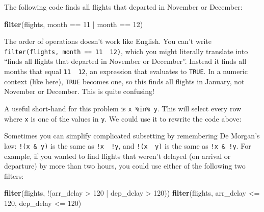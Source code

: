 \documentclass[]{book}
\newenvironment{Shaded}{\begin{snugshade}}{\end{snugshade}}
\newcommand{\KeywordTok}[1]{\textcolor[rgb]{0.13,0.29,0.53}{\textbf{{#1}}}}
\newcommand{\DecValTok}[1]{\textcolor[rgb]{0.00,0.00,0.81}{{#1}}}
\newcommand{\StringTok}[1]{\textcolor[rgb]{0.31,0.60,0.02}{{#1}}}
\newcommand{\NormalTok}[1]{{#1}}
\begin{document}
The following code finds all flights that departed in November or
December:

\begin{Shaded}
\begin{Highlighting}[]
\KeywordTok{filter}\NormalTok{(flights, month ==}\StringTok{ }\DecValTok{11} \NormalTok{|}\StringTok{ }\NormalTok{month ==}\StringTok{ }\DecValTok{12}\NormalTok{)}
\end{Highlighting}
\end{Shaded}

The order of operations doesn't work like English. You can't write
\texttt{filter(flights,\ month\ ==\ 11\ \textbar{}\ 12)}, which you
might literally translate into ``finds all flights that departed in
November or December''. Instead it finds all months that equal
\texttt{11\ \textbar{}\ 12}, an expression that evaluates to
\texttt{TRUE}. In a numeric context (like here), \texttt{TRUE} becomes
one, so this finds all flights in January, not November or December.
This is quite confusing!

A useful short-hand for this problem is \texttt{x\ \%in\%\ y}. This will
select every row where \texttt{x} is one of the values in \texttt{y}. We
could use it to rewrite the code above:

\begin{Shaded}
\end{Shaded}

Sometimes you can simplify complicated subsetting by remembering De
Morgan's law: \texttt{!(x\ \&\ y)} is the same as
\texttt{!x\ \textbar{}\ !y}, and \texttt{!(x\ \textbar{}\ y)} is the
same as \texttt{!x\ \&\ !y}. For example, if you wanted to find flights
that weren't delayed (on arrival or departure) by more than two hours,
you could use either of the following two filters:

\begin{Shaded}
\begin{Highlighting}[]
\KeywordTok{filter}\NormalTok{(flights, !(arr_delay >}\StringTok{ }\DecValTok{120} \NormalTok{|}\StringTok{ }\NormalTok{dep_delay >}\StringTok{ }\DecValTok{120}\NormalTok{))}
\KeywordTok{filter}\NormalTok{(flights, arr_delay <=}\StringTok{ }\DecValTok{120}\NormalTok{, dep_delay <=}\StringTok{ }\DecValTok{120}\NormalTok{)}
\end{Highlighting}
\end{Shaded}
\end{document}
